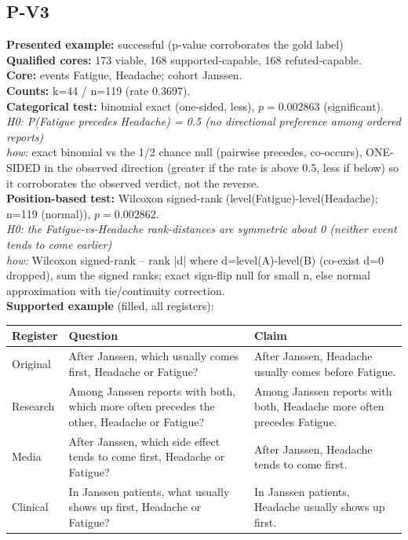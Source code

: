 \documentclass[11pt]{article}
\begin{document}
\subsection*{P-V3}
\textbf{Presented example:} successful (p-value corroborates the gold label) \\
\textbf{Qualified cores:} 173 viable, 168 supported-capable, 168 refuted-capable. \\
\textbf{Core:} events Fatigue, Headache; cohort Janssen. \\
\textbf{Counts:} k=44 / n=119  (rate 0.3697). \\
\textbf{Categorical test:} binomial exact (one-sided, less), $p = 0.002863$ (significant). \\
\emph{H0: P(Fatigue precedes Headache) = 0.5 (no directional preference among ordered reports)} \\
\emph{how:} exact binomial vs the 1/2 chance null (pairwise precedes, co-occurs), ONE-SIDED in the observed direction (greater if the rate is above 0.5, less if below) so it corroborates the observed verdict, not the reverse. \\
\textbf{Position-based test:} Wilcoxon signed-rank (level(Fatigue)-level(Headache); n=119 (normal)), $p = 0.002862$. \\
\emph{H0: the Fatigue-vs-Headache rank-distances are symmetric about 0 (neither event tends to come earlier)} \\
\emph{how:} Wilcoxon signed-rank -- rank |d| where d=level(A)-level(B) (co-exist d=0 dropped), sum the signed ranks; exact sign-flip null for small n, else normal approximation with tie/continuity correction. \\
\textbf{Supported example} (filled, all registers): \\
\begin{tabularx}{\linewidth}{@{}l L L@{}}
\toprule
\textbf{Register} & \textbf{Question} & \textbf{Claim} \\
\midrule
Original & After Janssen, which usually comes first, Headache or Fatigue? & After Janssen, Headache usually comes before Fatigue. \\
Research & Among Janssen reports with both, which more often precedes the other, Headache or Fatigue? & Among Janssen reports with both, Headache more often precedes Fatigue. \\
Media & After Janssen, which side effect tends to come first, Headache or Fatigue? & After Janssen, Headache tends to come first. \\
Clinical & In Janssen patients, what usually shows up first, Headache or Fatigue? & In Janssen patients, Headache usually shows up first. \\
\bottomrule
\end{tabularx}
\end{document}
